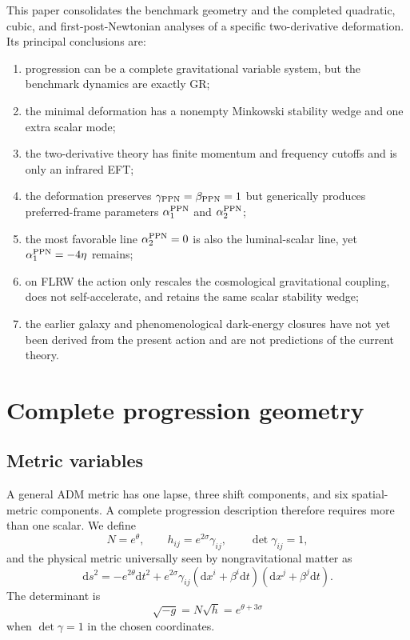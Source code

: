 \documentclass[11pt]{article}
\newcommand{\dd}{\mathrm{d}}
\newcommand{\aone}{\alpha_1^{\rm PPN}}
\newcommand{\atwo}{\alpha_2^{\rm PPN}}
\newcommand{\bppn}{\beta_{\rm PPN}}
\newcommand{\gppn}{\gamma_{\rm PPN}}
\begin{document}
This paper consolidates the benchmark geometry and the completed quadratic, cubic, and first-post-Newtonian analyses of a specific two-derivative deformation.  Its principal conclusions are:
\begin{enumerate}[label=(\roman*)]
\item progression can be a complete gravitational variable system, but the benchmark dynamics are exactly GR;
\item the minimal deformation has a nonempty Minkowski stability wedge and one extra scalar mode;
\item the two-derivative theory has finite momentum and frequency cutoffs and is only an infrared EFT;
\item the deformation preserves $\gppn=\bppn=1$ but generically produces preferred-frame parameters $\aone$ and $\atwo$;
\item the most favorable line $\atwo=0$ is also the luminal-scalar line, yet $\aone=-4\eta$ remains;
\item on FLRW the action only rescales the cosmological gravitational coupling, does not self-accelerate, and retains the same scalar stability wedge;
\item the earlier galaxy and phenomenological dark-energy closures have not yet been derived from the present action and are not predictions of the current theory.
\end{enumerate}

\section{Complete progression geometry}

\subsection{Metric variables}

A general ADM metric has one lapse, three shift components, and six spatial-metric components.  A complete progression description therefore requires more than one scalar.  We define
\begin{equation}
N=e^{\theta},\qquad h_{ij}=e^{2\sigma}\gamma_{ij},\qquad \det\gamma_{ij}=1,
\label{eq:progvars}
\end{equation}
and the physical metric universally seen by nongravitational matter as
\begin{equation}
\dd s^2=-e^{2\theta}\dd t^2+e^{2\sigma}\gamma_{ij}
(\dd x^i+\beta^i\dd t)(\dd x^j+\beta^j\dd t).
\label{eq:metric}
\end{equation}
The determinant is
\begin{equation}
\sqrt{-g}=N\sqrt h=e^{\theta+3\sigma}
\label{eq:det}
\end{equation}
when $\det\gamma=1$ in the chosen coordinates.
\end{document}
